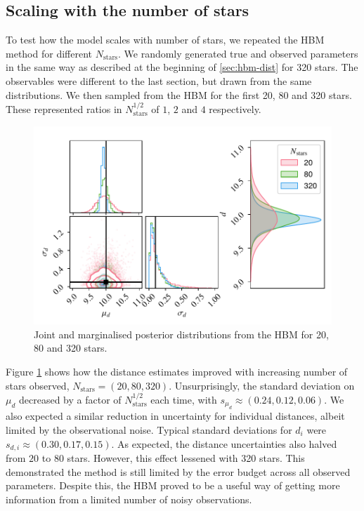 \subsection{Scaling with the number of stars}\label{sec:hbm-scale}

To test how the model scales with number of stars, we repeated the HBM method for different \(N_\mathrm{stars}\). We randomly generated true and observed parameters in the same way as described at the beginning of \ref{sec:hbm-dist} for 320 stars. The observables were different to the last section, but drawn from the same distributions. We then sampled from the HBM for the first 20, 80 and 320 stars. These represented ratios in \(N_\mathrm{stars}^{1/2}\) of \(1\), \(2\) and \(4\) respectively.

\begin{figure}[tb]
    \centering
    \includegraphics{figures/hbm-extended.pdf}
    \caption{Joint and marginalised posterior distributions from the HBM for 20, 80 and 320 stars.}
    \label{fig:hbm-extended}
\end{figure}

Figure \ref{fig:hbm-extended} shows how the distance estimates improved with increasing number of stars observed, \(N_\mathrm{stars}=(20,80,320)\). Unsurprisingly, the standard deviation on \(\mu_d\) decreased by a factor of \(N_\mathrm{stars}^{1/2}\) each time, with \(s_{\mu_d} \approx (0.24, 0.12, 0.06)\). We also expected a similar reduction in uncertainty for individual distances, albeit limited by the observational noise. Typical standard deviations for \(d_i\) were \(s_{d,i} \approx (0.30, 0.17, 0.15)\). As expected, the distance uncertainties also halved from \(20\) to \(80\) stars. However, this effect lessened with 320 stars. This demonstrated the method is still limited by the error budget across all observed parameters. Despite this, the HBM proved to be a useful way of getting more information from a limited number of noisy observations. 


